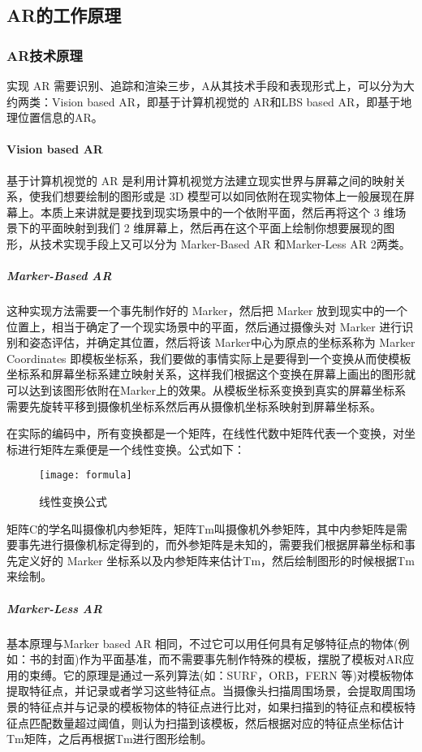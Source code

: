 \documentclass{article}
\begin{document}
\subsection{AR的工作原理}
\subsubsection{AR技术原理}
实现 AR 需要识别、追踪和渲染三步，A从其技术手段和表现形式上，可以分为大约两类：Vision based AR，即基于计算机视觉的 AR和LBS based AR，即基于地理位置信息的AR。\par
\paragraph{Vision based AR}
基于计算机视觉的 AR 是利用计算机视觉方法建立现实世界与屏幕之间的映射关系，使我们想要绘制的图形或是 3D 模型可以如同依附在现实物体上一般展现在屏幕上。本质上来讲就是要找到现实场景中的一个依附平面，然后再将这个 3 维场景下的平面映射到我们 2 维屏幕上，然后再在这个平面上绘制你想要展现的图形，从技术实现手段上又可以分为 Marker-Based AR 和Marker-Less AR 2两类。
\subparagraph{Marker-Based AR}
这种实现方法需要一个事先制作好的 Marker，然后把 Marker 放到现实中的一个位置上，相当于确定了一个现实场景中的平面，然后通过摄像头对 Marker 进行识别和姿态评估，并确定其位置，然后将该 Marker中心为原点的坐标系称为 Marker Coordinates 即模板坐标系，我们要做的事情实际上是要得到一个变换从而使模板坐标系和屏幕坐标系建立映射关系，这样我们根据这个变换在屏幕上画出的图形就可以达到该图形依附在Marker上的效果。从模板坐标系变换到真实的屏幕坐标系需要先旋转平移到摄像机坐标系然后再从摄像机坐标系映射到屏幕坐标系。\par
在实际的编码中，所有变换都是一个矩阵，在线性代数中矩阵代表一个变换，对坐标进行矩阵左乘便是一个线性变换。公式如下：\par
\begin{figure}[h!]
	\centering
	\texttt{[image: formula]}
	\caption{线性变换公式}
	\label{fig:universe}
\end{figure}

矩阵C的学名叫摄像机内参矩阵，矩阵Tm叫摄像机外参矩阵，其中内参矩阵是需要事先进行摄像机标定得到的，而外参矩阵是未知的，需要我们根据屏幕坐标和事先定义好的 Marker 坐标系以及内参矩阵来估计Tm，然后绘制图形的时候根据Tm来绘制。
\subparagraph{Marker-Less AR}
基本原理与Marker based AR 相同，不过它可以用任何具有足够特征点的物体(例如：书的封面)作为平面基准，而不需要事先制作特殊的模板，摆脱了模板对AR应用的束缚。它的原理是通过一系列算法(如：SURF，ORB，FERN 等)对模板物体提取特征点，并记录或者学习这些特征点。当摄像头扫描周围场景，会提取周围场景的特征点并与记录的模板物体的特征点进行比对，如果扫描到的特征点和模板特征点匹配数量超过阈值，则认为扫描到该模板，然后根据对应的特征点坐标估计Tm矩阵，之后再根据Tm进行图形绘制。
\end{document}
